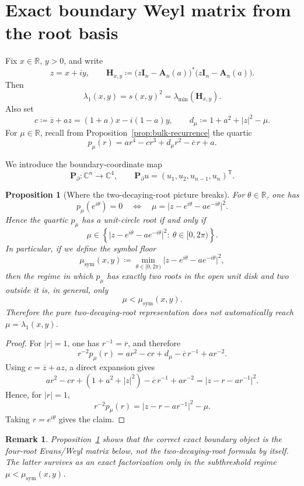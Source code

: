 \documentclass[11pt]{article}
\newtheorem{proposition}[theorem]{Proposition}
\newtheorem{remark}[theorem]{Remark}
\begin{document}
\section{Exact boundary Weyl matrix from the root basis}

Fix \(x\in\mathbb R\), \(y>0\), and write
\[
z=x+iy,
\qquad
\mathbf H_{x,y}
\coloneqq
\bigl(z\mathbf I_n-\mathbf A_n(a)\bigr)^*\bigl(z\mathbf I_n-\mathbf A_n(a)\bigr).
\]
Then
\[
\lambda_1(x,y)=s(x,y)^2=\lambda_{\min}(\mathbf H_{x,y}).
\]
Also set
\[
c\coloneqq \overline z + a z = (1+a)x-i(1-a)y,
\qquad
d_\mu\coloneqq 1+a^2+|z|^2-\mu.
\]
For \(\mu\in\mathbb R\), recall from Proposition~\ref{prop:bulk-recurrence} the quartic
\[
p_\mu(r)
=
a r^4-c r^3+d_\mu r^2-\overline c\,r+a.
\]

We introduce the boundary-coordinate map
\[
\mathbf P_\partial:\mathbb C^n\to\mathbb C^4,
\qquad
\mathbf P_\partial u=(u_1,u_2,u_{n-1},u_n)^{\mathsf T}.
\]

\begin{proposition}[Where the two-decaying-root picture breaks]\label{prop:symbol-floor}
For \(\theta\in\mathbb R\), one has
\[
p_\mu(e^{i\theta})=0
\quad\Longleftrightarrow\quad
\mu=
\bigl|z-e^{i\theta}-a e^{-i\theta}\bigr|^2.
\]
Hence the quartic \(p_\mu\) has a unit-circle root if and only if
\[
\mu\in
\left\{
\bigl|z-e^{i\theta}-a e^{-i\theta}\bigr|^2:\ \theta\in[0,2\pi)
\right\}.
\]
In particular, if we define the symbol floor
\[
\mu_{\mathrm{sym}}(x,y)
\coloneqq
\min_{\theta\in[0,2\pi)}
\bigl|z-e^{i\theta}-a e^{-i\theta}\bigr|^2,
\]
then the regime in which \(p_\mu\) has exactly two roots in the open unit disk and two outside it is, in general, only
\[
\mu<\mu_{\mathrm{sym}}(x,y).
\]
Therefore the pure two-decaying-root representation does \emph{not} automatically reach
\(\mu=\lambda_1(x,y)\).
\end{proposition}

\begin{proof}
For \(|r|=1\), one has \(r^{-1}=\overline r\), and therefore
\[
r^{-2}p_\mu(r)
=
a r^2-c r+d_\mu-\overline c\,r^{-1}+a r^{-2}.
\]
Using \(c=\overline z + a z\), a direct expansion gives
\[
a r^2-c r+(1+a^2+|z|^2)-\overline c\,r^{-1}+a r^{-2}
=
\bigl|z-r-a r^{-1}\bigr|^2.
\]
Hence, for \(|r|=1\),
\[
r^{-2}p_\mu(r)=\bigl|z-r-a r^{-1}\bigr|^2-\mu.
\]
Taking \(r=e^{i\theta}\) gives the claim.
\end{proof}

\begin{remark}
Proposition~\ref{prop:symbol-floor} shows that the correct exact boundary object is the
\emph{four-root} Evans/Weyl matrix below, not the two-decaying-root formula by itself.
The latter survives as an exact factorization only in the subthreshold regime
\(\mu<\mu_{\mathrm{sym}}(x,y)\).
\end{remark}
\end{document}
